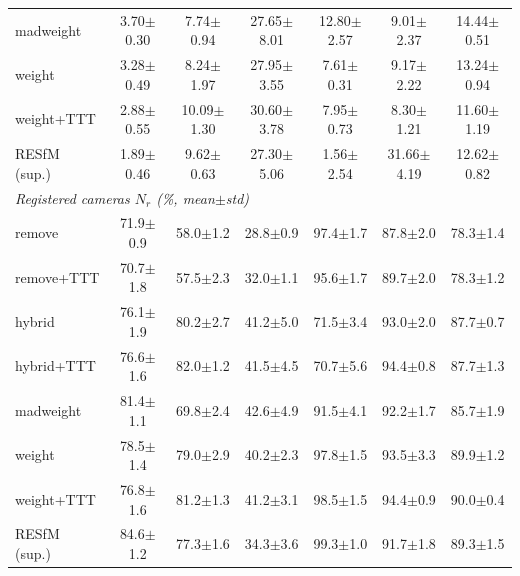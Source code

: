 \documentclass[10pt,twocolumn,letterpaper]{article}
\begin{document}
\begin{table}[t]
\begin{tabular}{lcccccc}
madweight & 3.70$\pm$0.30 & 7.74$\pm$0.94 & 27.65$\pm$8.01 & 12.80$\pm$2.57 & 9.01$\pm$2.37 & 14.44$\pm$0.51\\
weight & 3.28$\pm$0.49 & 8.24$\pm$1.97 & 27.95$\pm$3.55 & 7.61$\pm$0.31 & 9.17$\pm$2.22 & 13.24$\pm$0.94\\
weight+TTT & 2.88$\pm$0.55 & 10.09$\pm$1.30 & 30.60$\pm$3.78 & 7.95$\pm$0.73 & 8.30$\pm$1.21 & 11.60$\pm$1.19\\
RESfM (sup.) & 1.89$\pm$0.46 & 9.62$\pm$0.63 & 27.30$\pm$5.06 & 1.56$\pm$2.54 & 31.66$\pm$4.19 & 12.62$\pm$0.82\\
\midrule
\multicolumn{7}{l}{\emph{Registered cameras $N_r$ (\%, mean$\pm$std)}}\\[1pt]
remove & 71.9$\pm$0.9 & 58.0$\pm$1.2 & 28.8$\pm$0.9 & 97.4$\pm$1.7 & 87.8$\pm$2.0 & 78.3$\pm$1.4\\
remove+TTT & 70.7$\pm$1.8 & 57.5$\pm$2.3 & 32.0$\pm$1.1 & 95.6$\pm$1.7 & 89.7$\pm$2.0 & 78.3$\pm$1.2\\
hybrid & 76.1$\pm$1.9 & 80.2$\pm$2.7 & 41.2$\pm$5.0 & 71.5$\pm$3.4 & 93.0$\pm$2.0 & 87.7$\pm$0.7\\
hybrid+TTT & 76.6$\pm$1.6 & 82.0$\pm$1.2 & 41.5$\pm$4.5 & 70.7$\pm$5.6 & 94.4$\pm$0.8 & 87.7$\pm$1.3\\
madweight & 81.4$\pm$1.1 & 69.8$\pm$2.4 & 42.6$\pm$4.9 & 91.5$\pm$4.1 & 92.2$\pm$1.7 & 85.7$\pm$1.9\\
weight & 78.5$\pm$1.4 & 79.0$\pm$2.9 & 40.2$\pm$2.3 & 97.8$\pm$1.5 & 93.5$\pm$3.3 & 89.9$\pm$1.2\\
weight+TTT & 76.8$\pm$1.6 & 81.2$\pm$1.3 & 41.2$\pm$3.1 & 98.5$\pm$1.5 & 94.4$\pm$0.9 & 90.0$\pm$0.4\\
RESfM (sup.) & 84.6$\pm$1.2 & 77.3$\pm$1.6 & 34.3$\pm$3.6 & 99.3$\pm$1.0 & 91.7$\pm$1.8 & 89.3$\pm$1.5\\
\bottomrule
\end{tabular}
\end{table}
\end{document}

